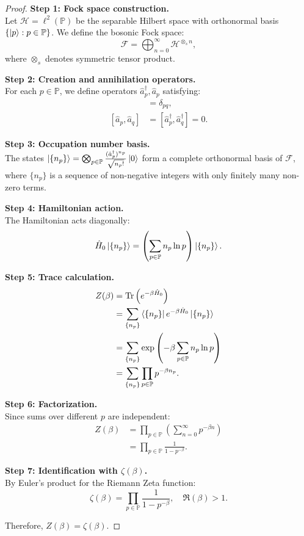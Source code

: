 \documentclass[11pt, a4paper]{article}
\theoremstyle{plain}
\theoremstyle{definition}
\begin{document}
\begin{proof}
\textbf{Step 1: Fock space construction.} \\
Let $\mathcal{H} = \ell^2(\mathbb{P})$ be the separable Hilbert space with orthonormal basis $\{\ket{p} : p \in \mathbb{P}\}$. We define the bosonic Fock space:
\begin{equation}
\mathcal{F} = \bigoplus_{n=0}^\infty \mathcal{H}^{\otimes_s n},
\end{equation}
where $\otimes_s$ denotes symmetric tensor product.

\textbf{Step 2: Creation and annihilation operators.} \\
For each $p \in \mathbb{P}$, we define operators $\hat{a}_p^\dagger, \hat{a}_p$ satisfying:
\begin{align}
[\hat{a}_p, \hat{a}_q^\dagger] &= \delta_{pq}, \\
[\hat{a}_p, \hat{a}_q] &= [\hat{a}_p^\dagger, \hat{a}_q^\dagger] = 0.
\end{align}

\textbf{Step 3: Occupation number basis.} \\
The states $\ket{\{n_p\}} = \bigotimes_{p \in \mathbb{P}} \frac{(\hat{a}_p^\dagger)^{n_p}}{\sqrt{n_p!}} \ket{0}$ form a complete orthonormal basis of $\mathcal{F}$, where $\{n_p\}$ is a sequence of non-negative integers with only finitely many non-zero terms.

\textbf{Step 4: Hamiltonian action.} \\
The Hamiltonian acts diagonally:
\begin{equation}
\hat{H}_0 \ket{\{n_p\}} = \left(\sum_{p \in \mathbb{P}} n_p \ln p\right) \ket{\{n_p\}}.
\end{equation}

\textbf{Step 5: Trace calculation.}
\begin{align*}
Z(\beta) &= \Tr\left(e^{-\beta \hat{H}_0}\right) \\
&= \sum_{\{n_p\}} \bra{\{n_p\}} e^{-\beta \hat{H}_0} \ket{\{n_p\}} \\
&= \sum_{\{n_p\}} \exp\left(-\beta \sum_{p \in \mathbb{P}} n_p \ln p\right) \\
&= \sum_{\{n_p\}} \prod_{p \in \mathbb{P}} p^{-\beta n_p}.
\end{align*}

\textbf{Step 6: Factorization.} \\
Since sums over different $p$ are independent:
\begin{align*}
Z(\beta) &= \prod_{p \in \mathbb{P}} \left( \sum_{n=0}^\infty p^{-\beta n} \right) \\
&= \prod_{p \in \mathbb{P}} \frac{1}{1 - p^{-\beta}}.
\end{align*}

\textbf{Step 7: Identification with $\zeta(\beta)$.} \\
By Euler's product for the Riemann Zeta function:
\begin{equation}
\zeta(\beta) = \prod_{p \in \mathbb{P}} \frac{1}{1 - p^{-\beta}}, \quad \Re(\beta) > 1.
\end{equation}

Therefore, $Z(\beta) = \zeta(\beta)$.
\end{proof}
\end{document}
